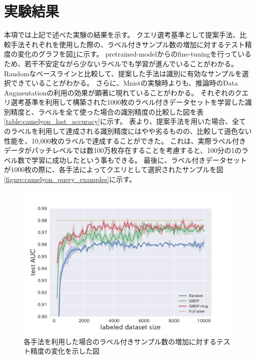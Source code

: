\section{実験結果}
本項では上記で述べた実験の結果を示す。
クエリ選考基準として提案手法、比較手法それぞれを使用した際の、ラベル付きサンプル数の増加に対するテスト精度の変化のグラフを図\ref{fig:camelyon_acc_graph}に示す。
pretrained-modelからのfine-tuningを行っているため、若干不安定ながら少ないラベルでも学習が進んでいることがわかる。
Randomなベースラインと比較して、提案した手法は識別に有効なサンプルを選択できていることがわかる。
さらに、Mnistの実験時よりも、推論時のData Augmentationの利用の効果が顕著に現れていることがわかる。
それぞれのクエリ選考基準を利用して構築された1000枚のラベル付きデータセットを学習した識別精度と、ラベルを全て使った場合の識別精度の比較した図を表\ref{table:camelyon_last_accuracy}に示す。
表より、提案手法を用いた場合、全てのラベルを利用して達成される識別精度にはやや劣るものの、比較して遜色ない性能を、10,000枚のラベルで達成することができた。
これは、実際ラベル付きデータがパッチレベルでは数100万枚存在することを考慮すると、100分の1のラベル数で学習に成功したという事もできる。
最後に、ラベル付きデータセットが1000枚の際に、各手法によってクエリとして選択されたサンプルを図\ref{figure:camelyon_query_examples}に示す。

\begin{figure}[tbp]
     \begin{center}
      \includegraphics[width=12cm]{figures/camelyon_acc_graph.pdf}
     \end{center}
    \label{fig:camelyon_acc_graph}
    \caption{各手法を利用した場合のラベル付きサンプル数の増加に対するテスト精度の変化を示した図}
\end{figure}

